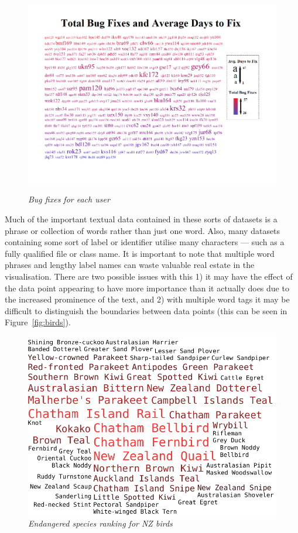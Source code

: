 \begin{figure}[!htb]
  \centering
  \includegraphics[scale=0.50]{buglist.png}
  \label{fig:buglist}
  \caption{\emph{Bug fixes for each user}}
  \label{fig:datasets2}
\end{figure}

Much of the important textual data contained in these sorts of datasets is a phrase or collection of words rather than just one word. Also, many datasets containing some sort of label or identifier utilise many characters --- such as a fully qualified file or class name. It is important to note that multiple word phrases and lengthy label names can waste valuable real estate in the visualisation. There are two possible issues with this 1) it may have the effect of the data point appearing to have more importance than it actually does due to the increased prominence of the text, and 2) with multiple word tags it may be difficult to distinguish the boundaries between data points (this can be seen in Figure~\vref{fig:birds}).

\begin{figure}[!htb]
	\centering
	\includegraphics[scale=0.50]{birds.png}
	\caption{\emph{Endangered species ranking for NZ birds}}
	\label{fig:birds}
\end{figure}

